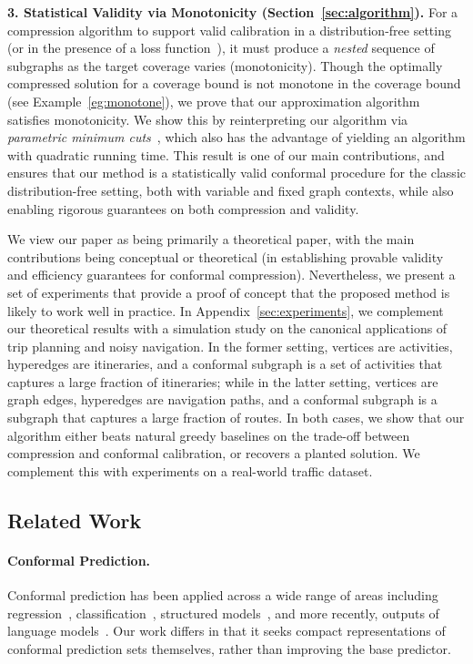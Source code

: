 \textbf{3. Statistical Validity via Monotonicity (Section~\ref{sec:algorithm}).} 
For a compression algorithm to support valid calibration in a distribution-free setting (or in the presence of a loss function~\cite{Risk}), it must produce a \emph{nested} sequence of subgraphs as the target coverage varies (monotonicity). Though the optimally compressed solution for a coverage bound is not monotone in the coverage bound (see Example~\ref{eg:monotone}), we prove that our approximation algorithm satisfies monotonicity. We show this by reinterpreting our algorithm via \emph{parametric minimum cuts}~\cite{gallo1989fast,ChekuriQT}, which also has the advantage of yielding an algorithm with quadratic running time. This result is one of our main contributions, and ensures that our method is a statistically valid conformal procedure for the classic distribution-free setting, both with variable and fixed graph contexts, while also enabling rigorous guarantees on both compression and validity. 

We view our paper as being primarily a theoretical paper, with the main contributions being conceptual or theoretical (in establishing provable validity and efficiency guarantees for conformal compression). Nevertheless, we present a set of experiments that provide a proof of concept that the proposed method is likely to work well in practice.  In Appendix~\ref{sec:experiments}, we complement our theoretical results with a simulation study on the canonical applications of trip planning and noisy navigation. In the former setting, vertices are activities, hyperedges are itineraries, and a conformal subgraph is a set of activities that captures a large fraction of itineraries; while in the latter setting, vertices are graph edges, hyperedges are navigation paths, and a conformal subgraph is a subgraph that captures a large fraction of routes. In both cases, we show that our algorithm either beats natural greedy baselines on the trade-off between compression and conformal calibration, or recovers a planted solution. We complement this with experiments on a real-world traffic dataset.


\subsection{Related Work}

\paragraph{Conformal Prediction.}
Conformal prediction has been applied across a wide range of areas
including regression~\cite{lei2018distribution,romano2019conformalized},
classification~\cite{vovk2005algorithmic,shafer2008tutorial},
structured models~\cite{zhang2025conformalstructuredprediction}, and more recently, outputs of language models~\cite{mohri2024languagemodelsconformalfactuality,cherian2024largelanguagemodelvalidity}. Our work differs in that it seeks compact representations of conformal prediction sets themselves, rather than improving the base predictor.   

